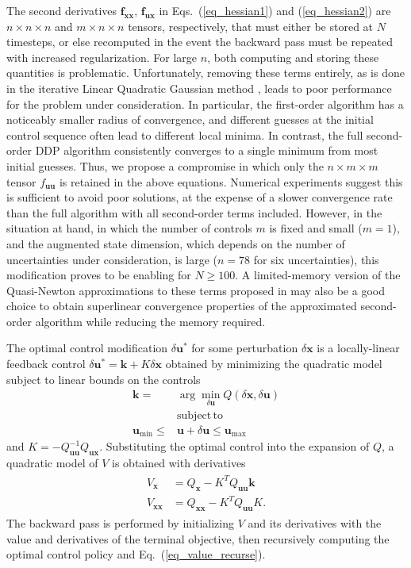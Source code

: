 \documentclass[journal ]{new-aiaa}
\newcommand{\state}{\ensuremath{\mathbf{x}}}
\newcommand{\control}{\ensuremath{\mathbf{u}}}
\begin{document}
The second derivatives $\mathbf{f}_{\state\state},\, \mathbf{f}_{\control\state}$ in Eqs.~(\ref{eq_hessian1}) and (\ref{eq_hessian2}) are $n\times n\times n$ and $m\times n\times n$ tensors, respectively, that must either be stored at $N$ timesteps, or else recomputed in the event the backward pass must be repeated with increased regularization. For large $n$, both computing and storing these quantities is problematic. Unfortunately, removing these terms entirely, as is done in the iterative Linear Quadratic Gaussian method \cite{iLQG}, leads to poor performance for the problem under consideration. In particular, the first-order algorithm has a noticeably smaller radius of convergence, and different guesses at the initial control sequence often lead to different local minima. In contrast, the full second-order DDP algorithm consistently converges to a single minimum from most initial guesses. Thus, we propose a compromise in which only the $n\times m \times m$ tensor $f_{\control\control}$ is retained in the above equations. Numerical experiments suggest this is sufficient to avoid poor solutions, at the expense of a slower convergence rate than the full algorithm with all second-order terms included. However, in the situation at hand, in which the number of controls $m$ is fixed and small ($ m=1 $), and the augmented state dimension, which depends on the number of uncertainties under consideration, is large ($n=78$ for six uncertainties), this modification proves to be enabling for $N\geq 100$. A limited-memory version of the Quasi-Newton approximations to these terms proposed in \cite{QNDDP} may also be a good choice to obtain superlinear convergence properties of the approximated second-order algorithm while reducing the memory required. 

The optimal control modification $\delta\control^*$ for some perturbation $\delta\state$ is a locally-linear feedback control $\delta\control^* = \mathbf{k} + K\delta\state$ obtained by minimizing the quadratic model subject to linear bounds on the controls
\begin{align}
\mathbf{k} = &\arg\min_{\delta\control} Q(\delta\state,\delta\control) \\
&\mathrm{subject\,to\,\;} \nonumber\\
\control_{\min}\le &\control+\delta\control \le\control_{\max}
\end{align}
and $K = -Q_{\control\control}^{-1}Q_{\control\state}$. Substituting the optimal control into the expansion of $Q$, a quadratic model of $V$ is obtained with derivatives
\begin{align}
\begin{split}
\label{eq_value_recurse}
V_\state &= Q_{\state}- K^TQ_{\control\control}\mathbf{k}\\
V_{\state\state} &= Q_{\state\state} - K^TQ_{\control\control}K.
\end{split}
\end{align}
The backward pass is performed by initializing $V$ and its derivatives with the value and derivatives of the terminal objective, then recursively computing the optimal control policy and Eq.~(\ref{eq_value_recurse}).
\end{document}
